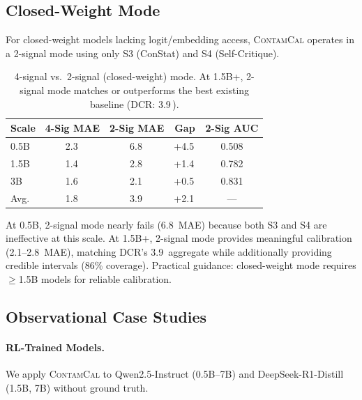 \documentclass[11pt,a4paper]{article}
\newcommand{\contamcal}{\textsc{ContamCal}}
\newcommand{\pp}{\,\text{pp}}
\begin{document}
\subsection{Closed-Weight Mode}
\label{sec:closed_weight}

For closed-weight models lacking logit/embedding access, \contamcal{} operates in a 2-signal mode using only S3 (ConStat) and S4 (Self-Critique).

\begin{table}[t]
\centering
\small
\caption{4-signal vs.\ 2-signal (closed-weight) mode. At 1.5B+, 2-signal mode matches or outperforms the best existing baseline (DCR: 3.9\pp{}).}
\label{tab:closed_weight}
\begin{tabular}{lcccc}
\toprule
\textbf{Scale} & \textbf{4-Sig MAE} & \textbf{2-Sig MAE} & \textbf{Gap} & \textbf{2-Sig AUC} \\
\midrule
0.5B & 2.3\pp{} & 6.8\pp{} & +4.5\pp{} & 0.508 \\
1.5B & 1.4\pp{} & 2.8\pp{} & +1.4\pp{} & 0.782 \\
3B   & 1.6\pp{} & 2.1\pp{} & +0.5\pp{} & 0.831 \\
\midrule
Avg. & 1.8\pp{} & 3.9\pp{} & +2.1\pp{} & --- \\
\bottomrule
\end{tabular}
\end{table}

At 0.5B, 2-signal mode nearly fails (6.8\pp{} MAE) because both S3 and S4 are ineffective at this scale.
At 1.5B+, 2-signal mode provides meaningful calibration (2.1--2.8\pp{} MAE), matching DCR's 3.9\pp{} aggregate while additionally providing credible intervals (86\% coverage).
Practical guidance: closed-weight mode requires $\geq$1.5B models for reliable calibration.

\subsection{Observational Case Studies}
\label{sec:observational}

\paragraph{RL-Trained Models.}
We apply \contamcal{} to Qwen2.5-Instruct (0.5B--7B) and DeepSeek-R1-Distill (1.5B, 7B) without ground truth.
\end{document}
